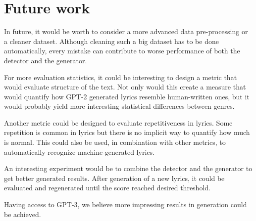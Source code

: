 \section*{Future work}
In future, it would be worth to consider a more advanced data pre-processing or a cleaner dataset. Although cleaning such a big dataset has to be done automatically, every mistake can contribute to worse performance of both the detector and the generator.

For more evaluation statistics, it could be interesting to design a metric that would evaluate structure of the text. Not only would this create a measure that would quantify how GPT-2 generated lyrics resemble human-written ones, but it would probably yield more interesting statistical differences between genres.

Another metric could be designed to evaluate repetitiveness in lyrics. Some repetition is common in lyrics but there is no implicit way to quantify how much is normal. This could also be used, in combination with other metrics, to automatically recognize machine-generated lyrics.

An interesting experiment would be to combine the detector and the generator to get better generated results. After generation of a new lyrics, it could be evaluated and regenerated until the score reached desired threshold.

Having access to GPT-3, we believe more impressing results in generation could be achieved.